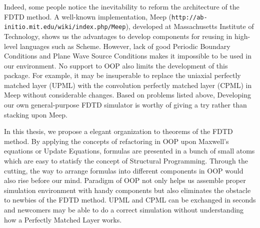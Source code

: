 Indeed, some people notice the inevitability to reform the architecture of the FDTD method. A well-known implementation, Meep
(\texttt{http://ab-initio.mit.edu/wiki/index.php/Meep}), developed at Massachusetts Institute of Technology, shows us the
advantages to develop components for reusing in high-level languages such as Scheme. However, lack of good Periodic
Boundary Conditions and Plane Wave Source Conditions makes it impossible to be used in our environment. No support to
OOP also limits the development of this package. For example, it may be insuperable to replace the uniaxial perfectly matched layer (UPML) with the convolution perfectly matched layer (CPML) in Meep
without considerable changes. Based on problems listed above, Developing our own general-purpose FDTD simulator is worthy of
giving a try rather than stacking upon Meep. 

In this thesis, we propose a elegant organization to theorems of the FDTD method. By applying the concepts of refactoring in OOP
upon Maxwell's equations or Update Equations, formulas are presented in a bunch of small atoms which are easy to
statisfy the concept of Structural Programming. Through the cutting, the way to arrange formulas into different
components in OOP would also rise before our mind. Paradigm of OOP not only helps us assemble proper simulation
environment with handy components but also eliminates the obstacle to newbies of the FDTD method. UPML and CPML can be exchanged in
seconds and newcomers may be able to do a correct simulation without understanding how a Perfectly Matched Layer works.
